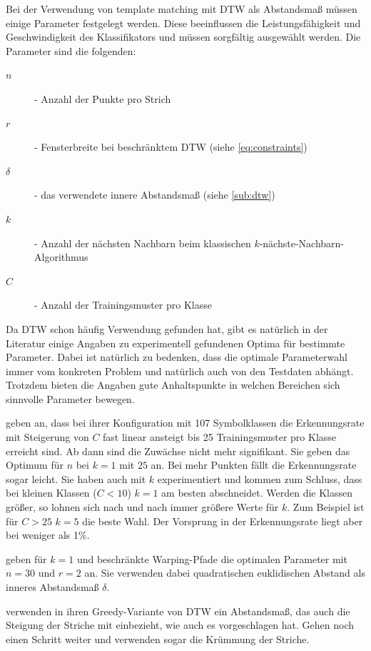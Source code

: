 Bei der Verwendung von template matching mit DTW als Abstandsmaß müssen einige Parameter festgelegt werden. Diese beeinflussen die Leistungsfähigkeit und Geschwindigkeit des Klassifikators und müssen sorgfältig ausgewählt werden. Die Parameter sind die folgenden:

\begin{description}
  \item[$n$] - Anzahl der Punkte pro Strich
  \item[$r$] - Fensterbreite bei beschränktem DTW (siehe \ref{eq:constraints})
  \item[$\delta$] - das verwendete innere Abstandsmaß (siehe \ref{sub:dtw})
  \item[$k$] - Anzahl der nächsten Nachbarn beim klassischen $k$-nächste-Nachbarn-Algorithmus
  \item[$C$] - Anzahl der Trainingsmuster pro Klasse
\end{description}

Da DTW schon häufig Verwendung gefunden hat, gibt es natürlich in der Literatur einige Angaben zu experimentell gefundenen Optima für bestimmte Parameter. Dabei ist natürlich zu bedenken, dass die optimale Parameterwahl immer vom konkreten Problem und natürlich auch von den Testdaten abhängt. Trotzdem bieten die Angaben gute Anhaltspunkte in welchen Bereichen sich sinnvolle Parameter bewegen.

\citet{Golubitsky:2009p1842} geben an, dass bei ihrer Konfiguration mit 107 Symbolklassen die Erkennungsrate mit Steigerung von $C$ fast linear ansteigt bis 25 Trainingsmuster pro Klasse erreicht sind. Ab dann sind die Zuwächse nicht mehr signifikant. Sie geben das Optimum für $n$ bei $k = 1$ mit $25$ an. Bei mehr Punkten fällt die Erkennungsrate sogar leicht. Sie haben auch mit $k$ experimentiert und kommen zum Schluss, dass bei kleinen Klassen ($C<10$) $k = 1$ am besten abschneidet. Werden die Klassen größer, so lohnen sich nach und nach immer größere Werte für $k$. Zum Beispiel ist für $C>25$  $k=5$ die beste Wahl. Der Vorsprung in der Erkennungsrate liegt aber bei weniger als 1\%.

\citet{Golubitsky:2009p2433} geben für $k=1$ und beschränkte Warping-Pfade die optimalen Parameter mit $n = 30$ und $r = 2$ an. Sie verwenden dabei quadratischen euklidischen Abstand als inneres Abstandsmaß $\delta$.

\citet{MacLean:2010p9970} verwenden in ihren Greedy-Variante von DTW ein Abstandsmaß, das auch die Steigung der Striche mit einbezieht, wie auch \citet{Tappert:1982p10305} es vorgeschlagen hat.
\citet{Vuong:2010p10279} Gehen noch einen Schritt weiter und verwenden sogar die Krümmung der Striche.